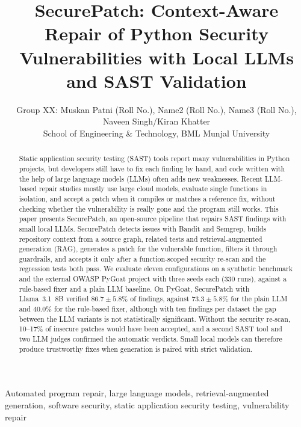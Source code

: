 \documentclass[12pt,onecolumn,draftclsnofoot]{IEEEtran}
\begin{document}
\title{SecurePatch: Context-Aware Repair of Python Security Vulnerabilities with Local LLMs and SAST Validation}

\author{Group XX: Muskan Patni (Roll No.), Name2 (Roll No.), Name3 (Roll No.), Naveen Singh/Kiran Khatter\\
School of Engineering \& Technology, BML Munjal University}

\maketitle

\begin{abstract}
Static application security testing (SAST) tools report many vulnerabilities in Python projects, but developers still have to fix each finding by hand, and code written with the help of large language models (LLMs) often adds new weaknesses. Recent LLM-based repair studies mostly use large cloud models, evaluate single functions in isolation, and accept a patch when it compiles or matches a reference fix, without checking whether the vulnerability is really gone and the program still works. This paper presents SecurePatch, an open-source pipeline that repairs SAST findings with small local LLMs. SecurePatch detects issues with Bandit and Semgrep, builds repository context from a source graph, related tests and retrieval-augmented generation (RAG), generates a patch for the vulnerable function, filters it through guardrails, and accepts it only after a function-scoped security re-scan and the regression tests both pass. We evaluate eleven configurations on a synthetic benchmark and the external OWASP PyGoat project with three seeds each (330 runs), against a rule-based fixer and a plain LLM baseline. On PyGoat, SecurePatch with Llama~3.1~8B verified $86.7 \pm 5.8\%$ of findings, against $73.3 \pm 5.8\%$ for the plain LLM and $40.0\%$ for the rule-based fixer, although with ten findings per dataset the gap between the LLM variants is not statistically significant. Without the security re-scan, 10--17\% of insecure patches would have been accepted, and a second SAST tool and two LLM judges confirmed the automatic verdicts. Small local models can therefore produce trustworthy fixes when generation is paired with strict validation.
\end{abstract}

\begin{IEEEkeywords}
Automated program repair, large language models, retrieval-augmented generation, software security, static application security testing, vulnerability repair
\end{IEEEkeywords}
\end{document}

